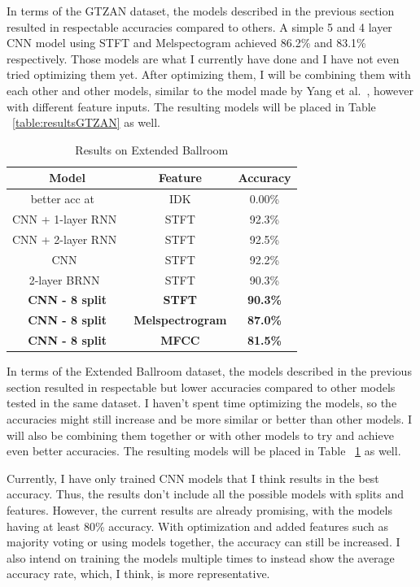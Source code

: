 \documentclass[10pt,twocolumn,letterpaper]{article}
\begin{document}
	In terms of the GTZAN dataset, the models described in the previous section resulted in respectable accuracies compared to others. A simple 5 and 4 layer CNN model using STFT and Melspectogram achieved 86.2\% and 83.1\% respectively. Those models are what I currently have done and I have not even tried optimizing them yet. After optimizing them, I will be combining them with each other and other models, similar to the model made by Yang et al.~\cite{yang2020parallel}, however with different feature inputs. The resulting models will be placed in Table ~\ref{table:resultsGTZAN} as well.
	
	\begin{table}[!htbp] %
		\caption{Results on Extended Ballroom}
		\centering
		\begin{tabular}[b]{ccc}
			\hline \hline
			Model & Feature & Accuracy 	\\ [0.5ex]
			\hline
			better acc at ~\cite{liu2020bottom} & IDK & 0.00\%			\\
			CNN + 1-layer RNN~\cite{yang2020parallel} & STFT & 92.3\%			\\
			CNN + 2-layer RNN~\cite{yang2020parallel} & STFT & 92.5\%			\\
			CNN~\cite{yang2020parallel} & STFT & 92.2\%							\\
			2-layer BRNN~\cite{schuster1997bidirectional} & STFT & 90.3\% 		\\
			\textbf{CNN - 8 split} & \textbf{STFT} & \textbf{90.3\%} 			\\
			\textbf{CNN - 8 split} & \textbf{Melspectrogram} & \textbf{87.0\%} 	\\
			\textbf{CNN - 8 split} & \textbf{MFCC} & \textbf{81.5\%} 			\\[1ex]
		\end{tabular}
	\label{table:resultsExtendedBallroom}
	\end{table}

	In terms of the Extended Ballroom dataset, the models described in the previous section resulted in respectable but lower accuracies compared to other models tested in the same dataset. I haven't spent time optimizing the models, so the accuracies might still increase and be more similar or better than other models. I will also be combining them together or with other models to try and achieve even better accuracies. The resulting models will be placed in Table ~\ref{table:resultsExtendedBallroom} as well.
	
	Currently, I have only trained CNN models that I think results in the best accuracy. Thus, the results don't include all the possible models with splits and features. However, the current results are already promising, with the models having at least 80\% accuracy. With optimization and added features such as majority voting or using models together, the accuracy can still be increased. I also intend on training the models multiple times to instead show the average accuracy rate, which, I think, is more representative. 
	
\end{document}
